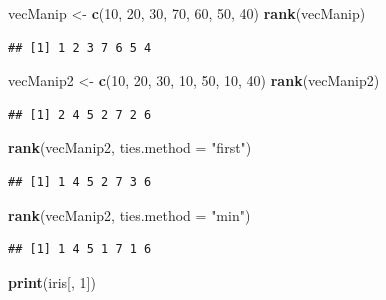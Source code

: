 \documentclass[
]{book}
\newenvironment{Shaded}{\begin{snugshade}}{\end{snugshade}}
\newcommand{\DataTypeTok}[1]{\textcolor[rgb]{0.13,0.29,0.53}{#1}}
\newcommand{\DecValTok}[1]{\textcolor[rgb]{0.00,0.00,0.81}{#1}}
\newcommand{\KeywordTok}[1]{\textcolor[rgb]{0.13,0.29,0.53}{\textbf{#1}}}
\newcommand{\NormalTok}[1]{#1}
\newcommand{\StringTok}[1]{\textcolor[rgb]{0.31,0.60,0.02}{#1}}
\begin{document}
\begin{Shaded}
\begin{Highlighting}[]
\NormalTok{vecManip <-}\StringTok{ }\KeywordTok{c}\NormalTok{(}\DecValTok{10}\NormalTok{, }\DecValTok{20}\NormalTok{, }\DecValTok{30}\NormalTok{, }\DecValTok{70}\NormalTok{, }\DecValTok{60}\NormalTok{, }\DecValTok{50}\NormalTok{, }\DecValTok{40}\NormalTok{)}
\KeywordTok{rank}\NormalTok{(vecManip)}
\end{Highlighting}
\end{Shaded}

\begin{verbatim}
## [1] 1 2 3 7 6 5 4
\end{verbatim}

\begin{Shaded}
\begin{Highlighting}[]
\NormalTok{vecManip2 <-}\StringTok{ }\KeywordTok{c}\NormalTok{(}\DecValTok{10}\NormalTok{, }\DecValTok{20}\NormalTok{, }\DecValTok{30}\NormalTok{, }\DecValTok{10}\NormalTok{, }\DecValTok{50}\NormalTok{, }\DecValTok{10}\NormalTok{, }\DecValTok{40}\NormalTok{)}
\KeywordTok{rank}\NormalTok{(vecManip2)}
\end{Highlighting}
\end{Shaded}

\begin{verbatim}
## [1] 2 4 5 2 7 2 6
\end{verbatim}

\begin{Shaded}
\begin{Highlighting}[]
\KeywordTok{rank}\NormalTok{(vecManip2, }\DataTypeTok{ties.method =} \StringTok{"first"}\NormalTok{)}
\end{Highlighting}
\end{Shaded}

\begin{verbatim}
## [1] 1 4 5 2 7 3 6
\end{verbatim}

\begin{Shaded}
\begin{Highlighting}[]
\KeywordTok{rank}\NormalTok{(vecManip2, }\DataTypeTok{ties.method =} \StringTok{"min"}\NormalTok{)}
\end{Highlighting}
\end{Shaded}

\begin{verbatim}
## [1] 1 4 5 1 7 1 6
\end{verbatim}

\begin{Shaded}
\begin{Highlighting}[]
\KeywordTok{print}\NormalTok{(iris[, }\DecValTok{1}\NormalTok{])}
\end{Highlighting}
\end{Shaded}
\end{document}
